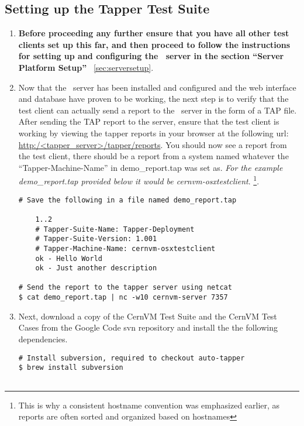 \subsection{Setting up the Tapper Test Suite}
\label{sec:osxtestsuite}
\begin{enumerate}
\item 	{\bf Before proceeding any further ensure that you have all other test clients set up this far, and then proceed
		to follow the instructions for setting up and configuring the \tapper~server in the section ``Server Platform Setup''}		
		~\ref{sec:serversetup}.
		
\item 	Now that the \tapper~server has been installed and configured and the \tapper web interface and database have proven
		to be working, the next step is to verify that the test client can actually send a report to the \tapper~server in
		the form of a TAP file. After sending the TAP report to the server, ensure that the test client is working by viewing 
		the tapper reports in your browser at the following url: \url{http:/<tapper\_server>/tapper/reports}. You should now see a 
		report from the test client, there should be a report from a system named whatever the ``Tapper-Machine-Name'' in 
		demo\_report.tap was set as. \emph{For the example demo\_report.tap provided below it would be cernvm-osxtestclient}.
		\footnote{This is why a consistent hostname convention was emphasized earlier, as reports are often sorted and organized 
		based on hostnames}.
		
\lstset{language=bash,caption=Send a Basic Report to the \tapper~Server}
\begin{lstlisting}
# Save the following in a file named demo_report.tap

	1..2
	# Tapper-Suite-Name: Tapper-Deployment
	# Tapper-Suite-Version: 1.001
	# Tapper-Machine-Name: cernvm-osxtestclient
	ok - Hello World
	ok - Just another description

# Send the report to the tapper server using netcat
$ cat demo_report.tap | nc -w10 cernvm-server 7357
\end{lstlisting}

\item 	Next, download a copy of the CernVM Test Suite and the CernVM Test Cases from the Google Code svn repository
		\cite{GCreleasetesting} and install the the following dependencies.
			
\lstset{language=bash,caption=Install CernVM Test Suite}
\begin{lstlisting}
# Install subversion, required to checkout auto-tapper
$ brew install subversion


\end{lstlisting}
\end{enumerate}
